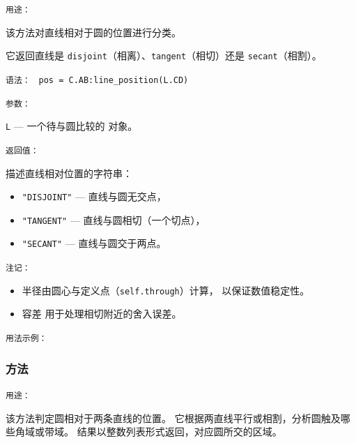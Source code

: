 \texttt{用途： }

该方法对直线相对于圆的位置进行分类。

它返回直线是 \texttt{disjoint}（相离）、\texttt{tangent}（相切）还是 \texttt{secant}（相割）。

\medskip
\texttt{语法： } \verb|pos = C.AB:line_position(L.CD)|

\medskip
\texttt{参数： }

 \texttt{L} — 一个待与圆比较的  对象。

\medskip
\texttt{返回值： }

描述直线相对位置的字符串：
\begin{itemize}
  \item \texttt{"DISJOINT"} — 直线与圆无交点，
  \item \texttt{"TANGENT"} — 直线与圆相切（一个切点），
  \item \texttt{"SECANT"} — 直线与圆交于两点。
\end{itemize}

\medskip
\texttt{注记： }

\begin{itemize}
  \item 半径由圆心与定义点（\texttt{self.through}）计算，
        以保证数值稳定性。
  \item 容差  用于处理相切附近的舍入误差。
\end{itemize}

\medskip
\texttt{用法示例： }

\begin{tkzexample}[latex=.5\textwidth]
\end{tkzexample}

\subsubsection{方法 }
\label{ssub:method_circle_lines_position}

\texttt{用途： }

该方法判定圆相对于两条直线的位置。
它根据两直线平行或相割，分析圆触及哪些角域或带域。
结果以整数列表形式返回，对应圆所交的区域。

